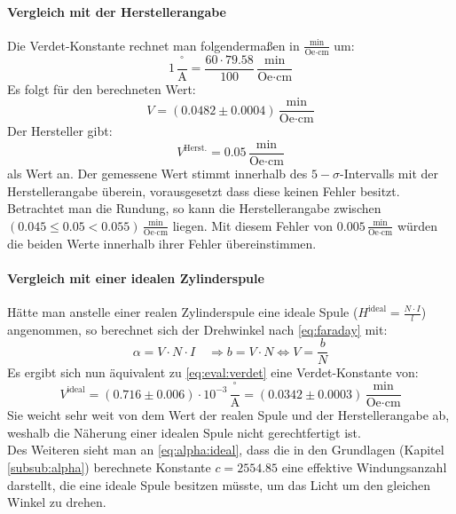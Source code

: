 \paragraph{Vergleich mit der Herstellerangabe}
Die Verdet-Konstante rechnet man folgendermaßen in $\frac{\text{min}}{\text{Oe}\cdot \text{cm}}$ um:
\begin{equation}
  1\,\frac{{}^\circ}{\text{A}} = \frac{60\cdot 79.58}{100}\,\frac{\text{min}}{\text{Oe}\cdot \text{cm}}
\end{equation}
Es folgt für den berechneten Wert:
\begin{equation}
  V = (0.0482 \pm 0.0004)\,\frac{\text{min}}{\text{Oe}\cdot \text{cm}}
\end{equation}
Der Hersteller gibt:
\begin{equation}
  V^{\text{Herst.}} = 0.05\,\frac{\text{min}}{\text{Oe}\cdot \text{cm}}
\end{equation}
als Wert an. Der gemessene Wert stimmt innerhalb des $5-\sigma$-Intervalls mit der Herstellerangabe überein, vorausgesetzt dass diese keinen Fehler 
besitzt. Betrachtet man die Rundung, so kann die Herstellerangabe zwischen $(0.045 \leq 0.05 < 0.055)\,\frac{\text{min}}{\text{Oe}\cdot \text{cm}}$ liegen. 
Mit diesem Fehler von $0.005\,\frac{\text{min}}{\text{Oe}\cdot \text{cm}}$  würden die beiden Werte innerhalb ihrer Fehler übereinstimmen.

\paragraph{Vergleich mit einer idealen Zylinderspule}
Hätte man anstelle einer realen Zylinderspule eine ideale Spule ($H^{\text{ideal}} = \frac{N \cdot I}{l}$) angenommen, 
so berechnet sich der Drehwinkel nach \autoref{eq:faraday} mit:
\begin{equation}
  \label{eq:alpha:ideal}
  \alpha = V \cdot N \cdot I \quad \Rightarrow b = V \cdot N \Leftrightarrow V = \frac{b}{N}
\end{equation}
Es ergibt sich nun äquivalent zu \autoref{eq:eval:verdet} eine Verdet-Konstante von:
\begin{equation}
  V^{\text{ideal}} = (0.716 \pm 0.006) \cdot 10^{-3}\,\frac{{}^\circ}{\text{A}} = (0.0342 \pm 0.0003)\,\frac{\text{min}}{\text{Oe}\cdot \text{cm}}
\end{equation}
Sie weicht sehr weit von dem Wert der realen Spule und der Herstellerangabe ab, weshalb die Näherung einer idealen Spule nicht gerechtfertigt ist. \\
Des Weiteren sieht man an \autoref{eq:alpha:ideal}, dass die in den Grundlagen (Kapitel \ref{subsub:alpha}) berechnete Konstante 
$c = 2554.85$ eine effektive Windungsanzahl darstellt, die eine ideale Spule besitzen müsste, um das Licht um den gleichen Winkel zu drehen.
